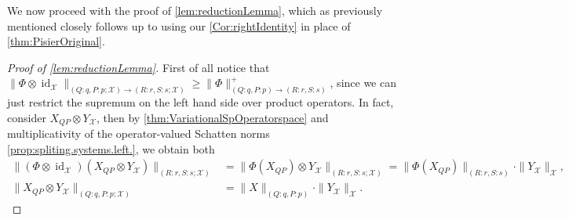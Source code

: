 \documentclass[11pt]{article}
\DeclareMathOperator{\id}{id}
\newcommand{\1}{\ensuremath{\mathbbm{1}}}
\theoremstyle{newdefinition}
\theoremstyle{newplain}
\theoremstyle{myplain}
\begin{document}
We now proceed with the proof of \cref{lem:reductionLemma}, which as previously mentioned closely follows \cite[Lemma 5]{Devetak.2006} up to using our \cref{Cor:rightIdentity} in place of \cref{thm:PisierOriginal}.
\begin{proof}[Proof of \cref{lem:reductionLemma}]
First of all notice that $\|\Phi\otimes\id_{\mathcal{X}}\|_{(Q:q,P:p;\mathcal{X})\to(R:r,S:s;\mathcal{X})} \geq \|\Phi\|^+_{(Q:q,P:p)\to (R:r,S:s)}$, since we can just restrict the supremum on the left hand side over product operators. In fact, consider $X_{QP}\otimes Y_{\mathcal{X}}$, then by \cref{thm:VariationalSpOperatorspace} and multiplicativity of the operator-valued Schatten norms \cref{prop:spliting.systems.left.}, we obtain both
\begin{align} 
\|(\Phi\otimes\id_{\mathcal{X}})(X_{QP}\otimes Y_{\mathcal{X}})\|_{(R:r,S:s;\mathcal{X})} &= \|\Phi(X_{QP})\otimes Y_{\mathcal{X}}\|_{(R:r,S:s;\mathcal{X})}= \|\Phi(X_{QP})\|_{(R:r,S:s)}\cdot \|Y_{\mathcal{X}}\|_{\mathcal{X}}, \\ 
\|X_{QP}\otimes Y_\mathcal{X}\|_{(Q:q,P:p;\mathcal{X})} &= \|X\|_{(Q:q,P:p)}\cdot\|Y_\mathcal{X}\|_{\mathcal{X}}.
\end{align}


\end{proof}
\end{document}
